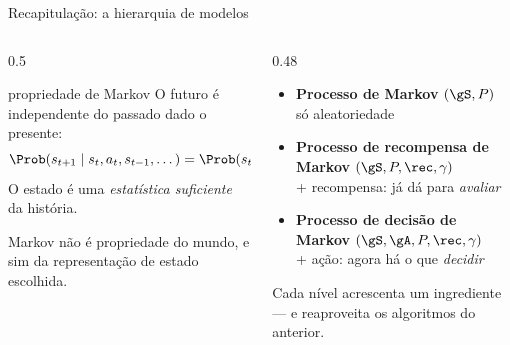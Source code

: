 \documentclass[aspectratio=169, 11pt]{beamer}
\begin{document}
\begin{frame}{Recapitulação: a hierarquia de modelos}
  \begin{columns}[T]
    \begin{column}{0.5\textwidth}
      \begin{defbox}{propriedade de Markov}
        O futuro é independente do passado dado o presente:
        \[
          \Prob(s_{t+1} \mid s_t, a_t, s_{t-1}, \dots) = \Prob(s_{t+1} \mid s_t, a_t).
        \]
        O estado é uma \emph{estatística suficiente} da história.
      \end{defbox}
      \begin{alertabox}
        Markov não é propriedade do mundo, e sim da \alert{representação de estado}
        escolhida.
      \end{alertabox}
    \end{column}
    \begin{column}{0.48\textwidth}
      \begin{itemize}\setlength{\itemsep}{0.7ex}
        \item \textbf{Processo de Markov} $(\gS, P)$ \\
              {\small só aleatoriedade}
        \item \textbf{Processo de recompensa de Markov} $(\gS, P, \rec, \gamma)$ \\
              {\small \alert{+ recompensa}: já dá para \emph{avaliar}}
        \item \textbf{Processo de decisão de Markov} $(\gS, \gA, P, \rec, \gamma)$ \\
              {\small \alert{+ ação}: agora há o que \emph{decidir}}
      \end{itemize}
      \vspace{0.5em}
      \begin{ideiabox}
        Cada nível acrescenta um ingrediente --- e reaproveita os algoritmos do anterior.
      \end{ideiabox}
    \end{column}
  \end{columns}
\end{frame}
\end{document}
